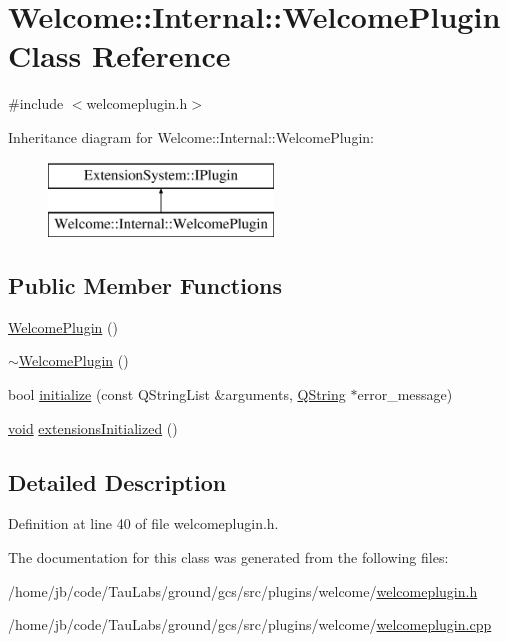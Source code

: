 \hypertarget{class_welcome_1_1_internal_1_1_welcome_plugin}{\section{\-Welcome\-:\-:\-Internal\-:\-:\-Welcome\-Plugin \-Class \-Reference}
\label{class_welcome_1_1_internal_1_1_welcome_plugin}
}


{\ttfamily \#include $<$welcomeplugin.\-h$>$}

\-Inheritance diagram for \-Welcome\-:\-:\-Internal\-:\-:\-Welcome\-Plugin\-:\begin{figure}[H]
\begin{center}
\leavevmode
\includegraphics[height=2.000000cm]{class_welcome_1_1_internal_1_1_welcome_plugin}
\end{center}
\end{figure}
\subsection*{\-Public \-Member \-Functions}
\begin{DoxyCompactItemize}
\item 
\hyperlink{group___welcome_plugin_gacfac7b166995a1d17463cee3c3f9ba83}{\-Welcome\-Plugin} ()
\item 
\hyperlink{group___welcome_plugin_ga5b42a68f1e63d6cbac39b81ee1b809ff}{$\sim$\-Welcome\-Plugin} ()
\item 
bool \hyperlink{group___welcome_plugin_gaf4200dea591acb8135c4f4e8e6b42c52}{initialize} (const \-Q\-String\-List \&arguments, \hyperlink{group___u_a_v_objects_plugin_gab9d252f49c333c94a72f97ce3105a32d}{\-Q\-String} $\ast$error\-\_\-message)
\item 
\hyperlink{group___u_a_v_objects_plugin_ga444cf2ff3f0ecbe028adce838d373f5c}{void} \hyperlink{group___welcome_plugin_gac1e50ee0aacda1d9e1b3bc829d0d4014}{extensions\-Initialized} ()
\end{DoxyCompactItemize}


\subsection{\-Detailed \-Description}


\-Definition at line 40 of file welcomeplugin.\-h.



\-The documentation for this class was generated from the following files\-:\begin{DoxyCompactItemize}
\item 
/home/jb/code/\-Tau\-Labs/ground/gcs/src/plugins/welcome/\hyperlink{welcomeplugin_8h}{welcomeplugin.\-h}\item 
/home/jb/code/\-Tau\-Labs/ground/gcs/src/plugins/welcome/\hyperlink{welcomeplugin_8cpp}{welcomeplugin.\-cpp}\end{DoxyCompactItemize}
